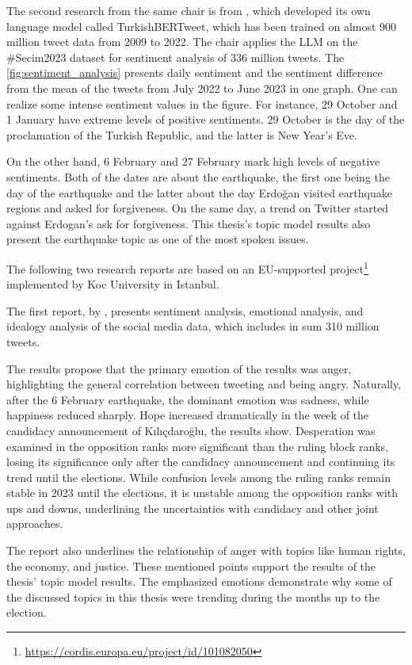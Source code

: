 The second research from the same chair is from \textcite{turkishbertweet_2023}, which developed its 
own language model called TurkishBERTweet, which has been trained on almost 900 million tweet data 
from 2009 to 2022. The chair applies the LLM on the \#Secim2023 dataset for sentiment analysis of 
336 million tweets. The \autoref{fig:sentiment_analysis} presents daily sentiment and the sentiment 
difference from the mean of the tweets from July 2022 to June 2023 in one graph. One can realize some 
intense sentiment values in the figure. For instance, 29 October and 1 January have extreme levels of 
positive sentiments. 29 October is the day of the proclamation of the Turkish Republic, and the latter 
is New Year's Eve.

On the other hand, 6 February and 27 February mark high levels of negative sentiments. Both of the 
dates are about the earthquake, the first one being the day of the earthquake and the latter about 
the day Erdo­ğan visited earthquake regions and asked for forgiveness. On the same day, a trend on 
Twitter started against Erdogan's ask for forgiveness. This thesis's topic model results also present 
the earthquake topic as one of the most spoken issues.

The following two research reports are based on an EU-supported 
project\footnote{\url{https://cordis.europa.eu/project/id/101082050}} implemented by Koc University 
in Istanbul.

The first report, by \textcite{politusanalytics_1_2023}, presents sentiment analysis, emotional analysis, 
and idealogy analysis of the social media data, which includes in sum 310 million tweets. 

The results propose that the primary emotion of the results was anger, highlighting the general 
correlation between tweeting and being angry. Naturally, after the 6 February earthquake, the 
dominant emotion was sadness, while happiness reduced sharply. Hope increased dramatically in the 
week of the candidacy announcement of Kılıçdaroğlu, the results show. Desperation was examined in 
the opposition ranks more significant than the ruling block ranks, losing its significance only 
after the candidacy announcement and continuing its trend until the elections. While confusion 
levels among the ruling ranks remain stable in 2023 until the elections, it is unstable among the
opposition ranks with ups and downs, underlining the uncertainties with candidacy and other joint 
approaches. 

The report also underlines the relationship of anger with topics like human rights, the economy, 
and justice. These mentioned points support the results of the thesis' topic model results. 
The emphasized emotions demonstrate why some of the discussed topics in this thesis were trending 
during the months up to the election.

